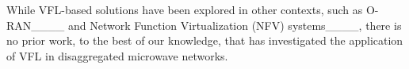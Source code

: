 While VFL-based solutions have been explored in other contexts, such as O-RAN____ and Network Function Virtualization (NFV) systems____, there is no prior work, to the best of our knowledge, that has investigated the application of VFL in disaggregated microwave networks. 


